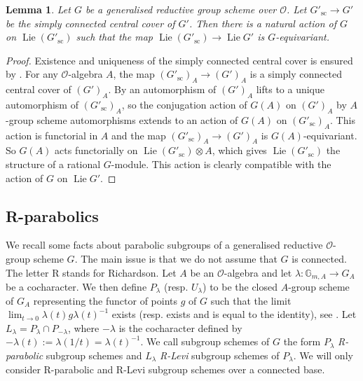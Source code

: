 \documentclass{amsart}
\newtheorem{lem}[prop]{Lemma}
\theoremstyle{definition}
\theoremstyle{remark}
\newcommand{\OO}{\mathcal O}
\DeclareMathOperator{\Lie}{Lie}
\newcommand{\sic}{\operatorname{sc}}
\begin{document}
\begin{lem}\label{Gprimesc_action} Let $G$ be a generalised reductive group scheme over $\OO$. Let $G'_{\sic}\rightarrow G'$ be the simply connected central cover of $G'$. Then there is a natural action of $G$ on $\Lie(G'_{\sic})$ such that the map $\Lie(G'_{\sic})\rightarrow \Lie G'$ is $G$-equivariant.
\end{lem}

\begin{proof}
    Existence and uniqueness of the simply connected central cover is ensured by \cite[Exercise 6.5.2 (i)]{bcnrd}.
    For any $\OO$-algebra $A$, the map $(G'_{\sic})_A \to (G')_A$ is a simply connected central cover of $(G')_A$.
    By \cite[Exercise 6.5.2 (iii)]{bcnrd} an automorphism of $(G')_A$ lifts to a unique automorphism of $(G'_{\sic})_A$, so the conjugation action of $G(A)$ on $(G')_A$ by $A$-group scheme automorphisms extends to an action of $G(A)$ on $(G'_{\sic})_A$. This action is functorial in $A$ and the map $(G'_{\sic})_A \to (G')_A$ is $G(A)$-equivariant. So $G(A)$ acts functorially on $\Lie(G'_{\sic}) \otimes A$, which gives $\Lie(G'_{\sic})$ the structure of a rational $G$-module. This action is clearly compatible with the action of $G$ on $\Lie G'$.
\end{proof}

\subsection{R-parabolics}\label{sec_R_parabolic}

We recall some facts about parabolic subgroups of a generalised reductive $\OO$-group scheme $G$. The main issue is that we do not assume that $G$ is connected. The letter R stands for Richardson. Let $A$ be an $\OO$-algebra
and let $\lambda: \mathbb{G}_{m, A} \rightarrow G_A$ be a cocharacter. We then define $P_{\lambda}$ (resp. $U_{\lambda}$) to be the closed $A$-group scheme of $G_A$ representing the functor
of points $g$ of $G$ such that the limit $\lim_{t\rightarrow 0} \lambda(t)g \lambda(t)^{-1}$ exists (resp. exists and is equal to the identity), see \cite[Lemmas 2.1.4, 2.1.5]{CGP}. Let $L_{\lambda}= P_{\lambda}\cap P_{-\lambda}$, 
where $-\lambda$ is the cocharacter defined by $-\lambda(t):= \lambda(1/t)= \lambda(t)^{-1}$. We call subgroup schemes of $G$ the form $P_{\lambda}$ 
\emph{R-parabolic} subgroup schemes and $L_{\lambda}$ \emph{R-Levi} subgroup 
schemes of $P_{\lambda}$. We will only consider R-parabolic and R-Levi subgroup schemes over a connected base. 
\end{document}

